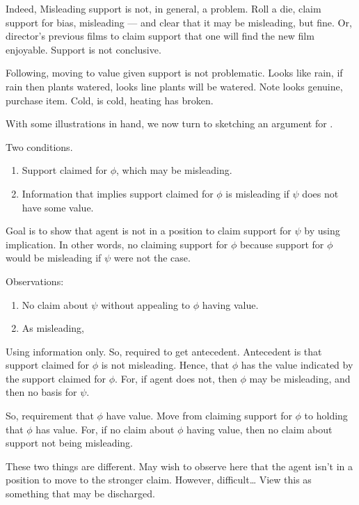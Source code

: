\begin{note}
  Indeed, Misleading support is not, in general, a problem.
  Roll a die, claim support for bias, misleading --- and clear that it may be misleading, but fine.
  Or, director's previous films to claim support that one will find the new film enjoyable.
  Support is not conclusive.

  Following, moving to value given support is not problematic.
  Looks like rain, if rain then plants watered, looks line plants will be watered.
  Note looks genuine, purchase item.
  Cold, is cold, heating has broken.
\end{note}

\begin{note}[Explanation of \nI{}]
  With some illustrations in hand, we now turn to sketching an argument for \nI{}.

  Two conditions.
  \begin{enumerate}
  \item Support claimed for \(\phi\), which may be misleading.
  \item Information that implies support claimed for \(\phi\) is misleading if \(\psi\) does not have some value.
  \end{enumerate}
  Goal is to show that agent is not in a position to claim support for \(\psi\) by using implication.
  In other words, no claiming support for \(\phi\) because support for \(\phi\) would be misleading if \(\psi\) were not the case.

  Observations:
  \begin{enumerate}
  \item No claim about \(\psi\) without appealing to \(\phi\) having value.
  \item As misleading, 
  \end{enumerate}

  Using information only.
  So, required to get antecedent.
  Antecedent is that support claimed for \(\phi\) is not misleading.
  Hence, that \(\phi\) has the value indicated by the support claimed for \(\phi\).
  For, if agent does not, then \(\phi\) may be misleading, and then no basis for \(\psi\).

  So, requirement that \(\phi\) have value.
  Move from claiming support for \(\phi\) to holding that \(\phi\) has value.
  For, if no claim about \(\phi\) having value, then no claim about support not being misleading.

  These two things are different.
  May wish to observe here that the agent isn't in a position to move to the stronger claim.
  However, difficult\dots
  View this as something that may be discharged.


\end{note}
